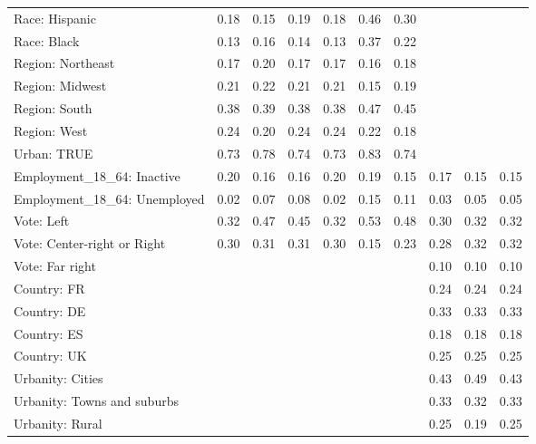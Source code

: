 \begin{tabular}[t]{llllllllll}
Race: Hispanic & 0.18 & 0.15 & 0.19 & 0.18 & 0.46 & 0.30 &  &  & \\
Race: Black & 0.13 & 0.16 & 0.14 & 0.13 & 0.37 & 0.22 &  &  & \\
\addlinespace
Region: Northeast & 0.17 & 0.20 & 0.17 & 0.17 & 0.16 & 0.18 &  &  & \\
Region: Midwest & 0.21 & 0.22 & 0.21 & 0.21 & 0.15 & 0.19 &  &  & \\
Region: South & 0.38 & 0.39 & 0.38 & 0.38 & 0.47 & 0.45 &  &  & \\
Region: West & 0.24 & 0.20 & 0.24 & 0.24 & 0.22 & 0.18 &  &  & \\
\addlinespace
Urban: TRUE & 0.73 & 0.78 & 0.74 & 0.73 & 0.83 & 0.74 &  &  & \\
\addlinespace
Employment\_18\_64: Inactive & 0.20 & 0.16 & 0.16 & 0.20 & 0.19 & 0.15 & 0.17 & 0.15 & 0.15\\
Employment\_18\_64: Unemployed & 0.02 & 0.07 & 0.08 & 0.02 & 0.15 & 0.11 & 0.03 & 0.05 & 0.05\\
\addlinespace
Vote: Left & 0.32 & 0.47 & 0.45 & 0.32 & 0.53 & 0.48 & 0.30 & 0.32 & 0.32\\
Vote: Center-right or Right & 0.30 & 0.31 & 0.31 & 0.30 & 0.15 & 0.23 & 0.28 & 0.32 & 0.32\\
Vote: Far right &  &  &  &  &  &  & 0.10 & 0.10 & 0.10\\
\addlinespace
Country: FR &  &  &  &  &  &  & 0.24 & 0.24 & 0.24\\
Country: DE &  &  &  &  &  &  & 0.33 & 0.33 & 0.33\\
Country: ES &  &  &  &  &  &  & 0.18 & 0.18 & 0.18\\
Country: UK &  &  &  &  &  &  & 0.25 & 0.25 & 0.25\\
\addlinespace
Urbanity: Cities &  &  &  &  &  &  & 0.43 & 0.49 & 0.43\\
Urbanity: Towns and suburbs &  &  &  &  &  &  & 0.33 & 0.32 & 0.33\\
Urbanity: Rural &  &  &  &  &  &  & 0.25 & 0.19 & 0.25\\
\bottomrule
\end{tabular}